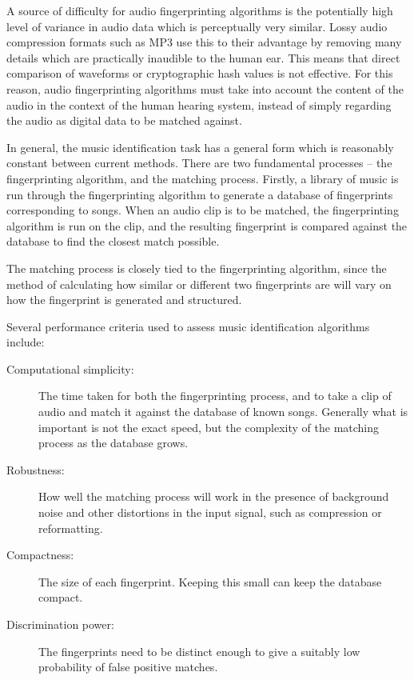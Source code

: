 \documentclass[12pt]{article}
\begin{document}
A source of difficulty for audio fingerprinting algorithms is the potentially high level of variance in audio data which is perceptually very similar. Lossy audio compression formats such as MP3 use this to their advantage by removing many details which are practically inaudible to the human ear. This means that direct comparison of waveforms or cryptographic hash values is not effective. For this reason, audio fingerprinting algorithms must take into account the content of the audio in the context of the human hearing system, instead of simply regarding the audio as digital data to be matched against.

In general, the music identification task has a general form which is reasonably constant between current methods. There are two fundamental processes -- the fingerprinting algorithm, and the matching process. Firstly, a library of music is run through the fingerprinting algorithm to generate a database of fingerprints corresponding to songs. When an audio clip is to be matched, the fingerprinting algorithm is run on the clip, and the resulting fingerprint is compared against the database to find the closest match possible.

The matching process is closely tied to the fingerprinting algorithm, since the method of calculating how similar or different two fingerprints are will vary on how the fingerprint is generated and structured.

Several performance criteria used to assess music identification algorithms include:

\begin{description}

\item [Computational simplicity:] The time taken for both the fingerprinting process, and to take a clip of audio and match it against the database of known songs. Generally what is important is not the exact speed, but the complexity of the matching process as the database grows.

\item [Robustness:] How well the matching process will work in the presence of background noise and other distortions in the input signal, such as compression or reformatting.

\item [Compactness:] The size of each fingerprint. Keeping this small can keep the database compact.

\item [Discrimination power:] The fingerprints need to be distinct enough to give a suitably low probability of false positive matches.

\end{description}
\end{document}

